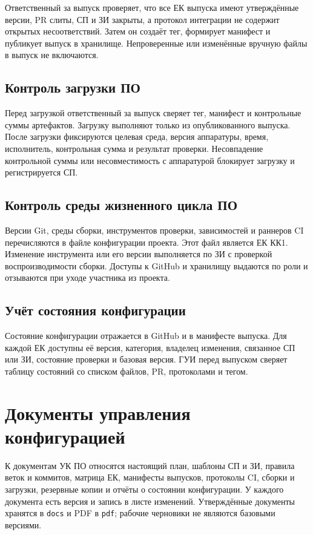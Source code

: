 \documentclass{tpks}
\begin{document}
Ответственный за выпуск проверяет, что все ЕК выпуска имеют утверждённые версии,
PR слиты, СП и ЗИ закрыты, а протокол интеграции не содержит открытых
несоответствий. Затем он создаёт тег, формирует манифест и публикует выпуск в
хранилище. Непроверенные или изменённые вручную файлы в выпуск не включаются.

\subsection{Контроль загрузки ПО}

Перед загрузкой ответственный за выпуск сверяет тег, манифест и контрольные
суммы артефактов. Загрузку выполняют только из опубликованного выпуска. После
загрузки фиксируются целевая среда, версия аппаратуры, время, исполнитель,
контрольная сумма и результат проверки. Несовпадение контрольной суммы или
несовместимость с аппаратурой блокирует загрузку и регистрируется СП.

\subsection{Контроль среды жизненного цикла ПО}

Версии Git, среды сборки, инструментов проверки, зависимостей и раннеров CI
перечисляются в файле конфигурации проекта. Этот файл является ЕК КК1. Изменение
инструмента или его версии выполняется по ЗИ с проверкой воспроизводимости
сборки. Доступы к GitHub и хранилищу выдаются по роли и отзываются при уходе
участника из проекта.

\subsection{Учёт состояния конфигурации}

Состояние конфигурации отражается в GitHub и в манифесте выпуска. Для каждой ЕК
доступны её версия, категория, владелец изменения, связанное СП или ЗИ, состояние
проверки и базовая версия. ГУИ перед выпуском сверяет таблицу состояний со
списком файлов, PR, протоколами и тегом.

\section{Документы управления конфигурацией}

К документам УК ПО относятся настоящий план, шаблоны СП и ЗИ, правила веток и
коммитов, матрица ЕК, манифесты выпусков, протоколы CI, сборки и загрузки,
резервные копии и отчёты о состоянии конфигурации. У каждого документа есть
версия и запись в листе изменений. Утверждённые документы хранятся в
\texttt{docs} и PDF в \texttt{pdf}; рабочие черновики не являются базовыми
версиями.
\end{document}
